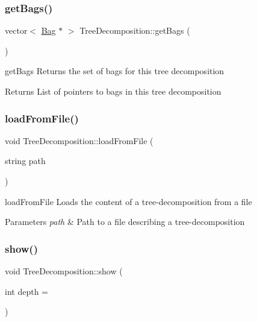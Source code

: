 \subsubsection{\texorpdfstring{get\+Bags()}{getBags()}}
{\footnotesize\ttfamily vector$<$ \hyperlink{class_bag}{Bag} $\ast$ $>$ Tree\+Decomposition\+::get\+Bags (\begin{DoxyParamCaption}{ }\end{DoxyParamCaption})}



get\+Bags Returns the set of bags for this tree decomposition 

\begin{DoxyReturn}{Returns}
List of pointers to bags in this tree decomposition 
\end{DoxyReturn}
\mbox{\label{class_tree_decomposition_abc2d6a2e7023ada23048b9a4832ef1b1}} 
\subsubsection{\texorpdfstring{load\+From\+File()}{loadFromFile()}}
{\footnotesize\ttfamily void Tree\+Decomposition\+::load\+From\+File (\begin{DoxyParamCaption}\item[{string}]{path }\end{DoxyParamCaption})}



load\+From\+File Loads the content of a tree-\/decomposition from a file 


\begin{DoxyParams}{Parameters}
{\em path} & Path to a file describing a tree-\/decomposition \\
\hline
\end{DoxyParams}
\mbox{\label{class_tree_decomposition_a328efa3fba52a273997eac5fe43083f3}} 
\subsubsection{\texorpdfstring{show()}{show()}}
{\footnotesize\ttfamily void Tree\+Decomposition\+::show (\begin{DoxyParamCaption}\item[{int}]{depth = {} }\end{DoxyParamCaption})}



